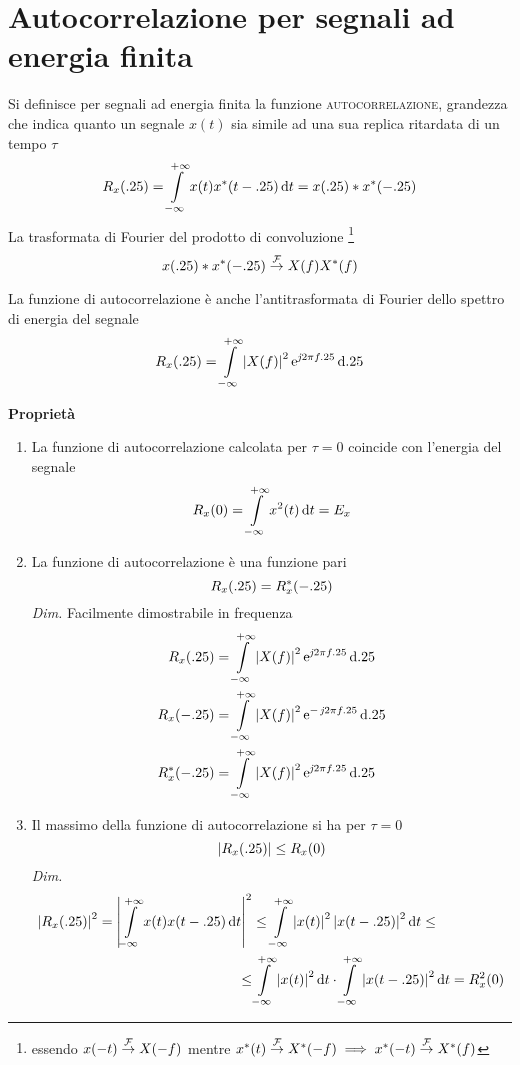 \section{Autocorrelazione per segnali ad energia finita}
Si definisce per segnali ad energia finita la funzione \textsc{autocorrelazione}, grandezza che indica quanto un segnale $x(t)$ sia simile ad una sua replica ritardata di un tempo $\tau$
\begin{equation}R_x(.25)=\int\limits_{-\infty}^{+\infty}{x(t){x}^\ast(t-.25)}{\,\mathop{}\!\mathrm{d}{t}}=x(.25)\ast {x}^\ast(-.25)\end{equation}
La trasformata di Fourier del prodotto di convoluzione \footnote{essendo $x(-t)\overset{\operatorname{\mathcal{F}}}{\to}X(-f)$ mentre ${x}^\ast(t)\overset{\operatorname{\mathcal{F}}}{\to}{X}^\ast(-f) \implies {x}^\ast(-t)\overset{\operatorname{\mathcal{F}}}{\to}{X}^\ast(f)$
}
\[x(.25)\ast {x}^\ast(-.25)\overset{\operatorname{\mathcal{F}}}{\to}X(f){X}^\ast(f)\]

La funzione di autocorrelazione è anche l'antitrasformata di Fourier dello spettro di energia del segnale
\begin{equation}
R_x(.25)=\int\limits_{-\infty}^{+\infty}{\left|{X(f)}\right|^2\operatorname{e}^{\operatorname{\mathit{j}\!} 2\pi f.25}}{\,\mathop{}\!\mathrm{d}{.25}}
\end{equation}

\textbf{Proprietà}
\begin{enumerate}
\item La funzione di autocorrelazione calcolata per $\tau=0$ coincide con l'energia del segnale
\[R_x(0)=\int\limits_{-\infty}^{+\infty}{x^2(t)}{\,\mathop{}\!\mathrm{d}{t}}=E_x\]
\item La funzione di autocorrelazione è una funzione pari
\[R_x(.25)=R_{x}^\ast(-.25)\]
\emph{Dim.} Facilmente dimostrabile in frequenza 
\[\begin{split}R_x(.25)&=\int\limits_{-\infty}^{+\infty}{\left|{X(f)}\right|^2\operatorname{e}^{\operatorname{\mathit{j}\!} 2\pi f.25}}{\,\mathop{}\!\mathrm{d}{.25}}\\
R_x(-.25)&=\int\limits_{-\infty}^{+\infty}{\left|{X(f)}\right|^2\operatorname{e}^{-\operatorname{\mathit{j}\!} 2\pi f.25}}{\,\mathop{}\!\mathrm{d}{.25}}\\
R_{x}^\ast(-.25)&=\int\limits_{-\infty}^{+\infty}{\left|{X(f)}\right|^2\operatorname{e}^{\operatorname{\mathit{j}\!} 2\pi f.25}}{\,\mathop{}\!\mathrm{d}{.25}}\end{split}\]
\item Il massimo della funzione di autocorrelazione si ha per $\tau=0$
\[\left|{R_x(.25)}\right|\leq R_x(0)\]
\emph{Dim.}
\[\begin{split}\left|{R_x(.25)}\right|^2=\left|{\int\limits_{-\infty}^{+\infty}{x(t)x(t-.25)}{\,\mathop{}\!\mathrm{d}{t}}}\right|^2&\leq\int\limits_{-\infty}^{+\infty}{\left|{x(t)}\right|^2\left|{x(t-.25)}\right|^2}{\,\mathop{}\!\mathrm{d}{t}}\leq\\\leq&\int\limits_{-\infty}^{+\infty}{\left|{x(t)}\right|^2}{\,\mathop{}\!\mathrm{d}{t}}\cdot\int\limits_{-\infty}^{+\infty}{\left|{x(t-.25)}\right|^2}{\,\mathop{}\!\mathrm{d}{t}}=R_x^2(0)\end{split}\]
\end{enumerate}

